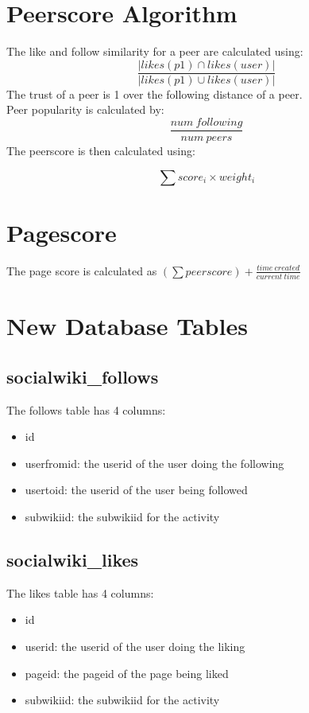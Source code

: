 \documentclass[letterpaper,twoside,11pt]{article}
\begin{document}
\section{Peerscore Algorithm}
	The like and follow similarity for a peer are calculated using: 
		\[
		\frac{|likes (p1)\cap likes(user)|}{|likes(p1)\cup likes (user)|}
	\]
	The trust of a peer is 1 over the following distance of a peer.
	\newline
	\\Peer popularity is calculated by: 
		\[
		\frac{num\ following}{num\ peers}
	\]
	The peerscore is then calculated using:
	
		\[
		\sum score_i\times weight_i
	\]
	
\section{Pagescore}
	The page score is calculated as $(\sum peerscore)+\frac{time\ created}{current\ time} $
	
\section{New Database Tables}
	\subsection{socialwiki\_follows}
	The follows table has 4 columns:
	\begin{itemize}
		\item id
		\item userfromid: the userid of the user doing the following
		\item usertoid: the userid of the user being followed
		\item subwikiid: the subwikiid for the activity
	\end{itemize}
	\subsection{socialwiki\_likes}
	The likes table has 4 columns:
	\begin{itemize}
		\item id
		\item userid: the userid of the user doing the liking
		\item pageid: the pageid of the page being liked
		\item subwikiid: the subwikiid for the activity 
	\end{itemize}
	
\end{document}
